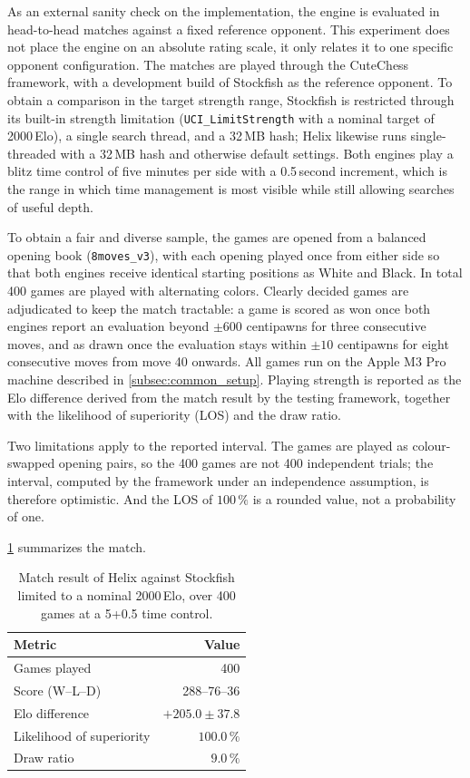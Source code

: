 As an external sanity check on the implementation, the engine is evaluated in
head-to-head matches against a fixed reference opponent. This experiment does not
place the engine on an absolute rating scale, it only relates it to one specific
opponent configuration. The matches are played through the CuteChess framework, with a
development build of Stockfish as the reference opponent. To obtain a comparison
in the target strength range, Stockfish is restricted through its built-in
strength limitation (\texttt{UCI\_LimitStrength} with a nominal target of
2000\,Elo), a single search thread, and a 32\,MB hash; Helix likewise runs
single-threaded with a 32\,MB hash and otherwise default settings. Both engines
play a blitz time control of five minutes per side with a 0.5\,second increment,
which is the range in which time management is most visible while still allowing
searches of useful depth.

To obtain a fair and diverse sample, the games are opened from a balanced opening
book (\texttt{8moves\_v3}), with each opening played once from either side so
that both engines receive identical starting positions as White and Black. In
total 400 games are played with alternating colors. Clearly decided games are
adjudicated to keep the match tractable: a game is scored as won once both
engines report an evaluation beyond $\pm 600$ centipawns for three consecutive
moves, and as drawn once the evaluation stays within $\pm 10$ centipawns for
eight consecutive moves from move 40 onwards. All games run on the Apple
M3 Pro machine described in \cref{subsec:common_setup}. Playing strength is
reported as the Elo difference derived from the match result by the testing
framework, together with the likelihood of superiority (LOS) and the draw ratio.

Two limitations apply to the reported interval. The games are played as
colour-swapped opening pairs, so the 400 games are not 400 independent trials;
the interval, computed by the framework under an independence assumption, is
therefore optimistic. And the LOS of $100\,\%$ is a rounded value, not a
probability of one.

\cref{tab:elo_results} summarizes the match.

\begin{table}[ht]
\centering
\begin{tabular}{@{}lr@{}}
\toprule
Metric & Value \\ \midrule
Games played & 400 \\
Score (W--L--D) & 288--76--36 \\
Elo difference & $+205.0 \pm 37.8$ \\
Likelihood of superiority & $100.0\,\%$ \\
Draw ratio & $9.0\,\%$ \\ \bottomrule
\end{tabular}
\caption{Match result of Helix against Stockfish limited to a nominal 2000\,Elo,
over 400 games at a 5+0.5 time control.}
\label{tab:elo_results}
\end{table}

